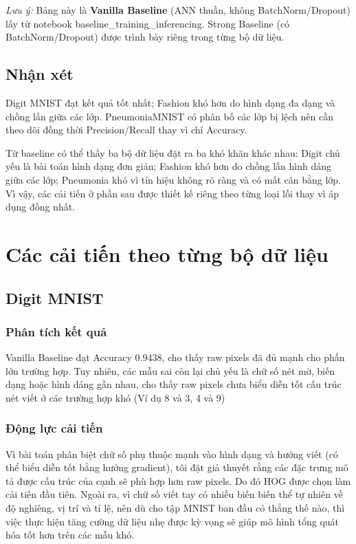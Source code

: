 \documentclass[a4paper,12pt]{report}
\begin{document}
\textit{Lưu ý:} Bảng này là \textbf{Vanilla Baseline} (ANN thuần, không BatchNorm/Dropout) lấy từ notebook baseline\_training\_inferencing. Strong Baseline (có BatchNorm/Dropout) được trình bày riêng trong từng bộ dữ liệu.

\subsection{Nhận xét}
Digit MNIST đạt kết quả tốt nhất; Fashion khó hơn do hình dạng đa dạng và chồng lấn giữa các lớp. PneumoniaMNIST có phân bố các lớp bị lệch nên cần theo dõi đồng thời Precision/Recall thay vì chỉ Accuracy.

Từ baseline có thể thấy ba bộ dữ liệu đặt ra ba khó khăn khác nhau: Digit chủ yếu là bài toán hình dạng đơn giản; Fashion khó hơn do chồng lấn hình dáng giữa các lớp; Pneumonia khó vì tín hiệu không rõ ràng và có mất cân bằng lớp. Vì vậy, các cải tiến ở phần sau được thiết kế riêng theo từng loại lỗi thay vì áp dụng đồng nhất.

\section{Các cải tiến theo từng bộ dữ liệu}
\subsection{Digit MNIST}
\subsubsection{Phân tích kết quả}
Vanilla Baseline đạt Accuracy 0.9438, cho thấy raw pixels đã đủ mạnh cho phần lớn trường hợp. Tuy nhiên, các mẫu sai còn lại chủ yếu là chữ số nét mờ, biến dạng hoặc hình dáng gần nhau, cho thấy raw pixels chưa biểu diễn tốt cấu trúc nét viết ở các trường hợp khó (Ví dụ 8 và 3, 4 và 9) 


\subsubsection{Động lực cải tiến}
Vì bài toán phân biệt chữ số phụ thuộc mạnh vào hình dạng và hướng viết (có thể biểu diễn tốt bằng hướng gradient), tôi đặt giả thuyết rằng các đặc trưng mô tả được cấu trúc của cạnh sẽ phù hợp hơn raw pixels. Do đó HOG được chọn làm cải tiến đầu tiên. Ngoài ra, vì chữ số viết tay có nhiều biến biến thể tự nhiên về độ nghiêng, vị trí và tỉ lệ, nên dù cho tập MNIST ban đầu có thẳng thế nào, thì việc thực hiện tăng cường dữ liệu nhẹ được kỳ vọng sẽ giúp mô hình tổng quát hóa tốt hơn trên các mẫu khó.
\end{document}
